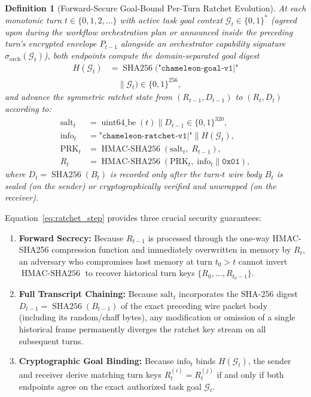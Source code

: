 \documentclass[conference,10pt]{IEEEtran}
\newtheorem{definition}{Definition}
\begin{document}
\begin{definition}[Forward-Secure Goal-Bound Per-Turn Ratchet Evolution]
\label{def:ratchet}
At each monotonic turn $t \in \{0, 1, 2, \dots\}$ with active task goal context $\mathcal{G}_t \in \{0,1\}^*$ (agreed upon during the workflow orchestration plan or announced inside the preceding turn's encrypted envelope $P_{t-1}$ alongside an orchestrator capability signature $\sigma_{\text{orch}}(\mathcal{G}_t)$), both endpoints compute the domain-separated goal digest
\begin{equation}
\label{eq:goal_digest}
\begin{aligned}
H(\mathcal{G}_t) &= \operatorname{SHA256}\big(\texttt{"chameleon-goal-v1|"} \\
&\quad \parallel \mathcal{G}_t\big) \in \{0,1\}^{256},
\end{aligned}
\end{equation}
and advance the symmetric ratchet state from $(R_{t-1}, D_{t-1})$ to $(R_t, D_t)$ according to:
\begin{equation}
\label{eq:ratchet_step}
\begin{aligned}
\text{salt}_t &= \operatorname{uint64\_be}(t) \parallel D_{t-1} \in \{0,1\}^{320}, \\
\text{info}_t &= \texttt{"chameleon-ratchet-v1|"} \parallel H(\mathcal{G}_t), \\
\text{PRK}_t &= \operatorname{HMAC-SHA256}\left(\text{salt}_t,\; R_{t-1}\right), \\
R_t &= \operatorname{HMAC-SHA256}\left(\text{PRK}_t,\; \text{info}_t \parallel \mathtt{0x01}\right),
\end{aligned}
\end{equation}
where $D_t = \operatorname{SHA256}(B_t)$ is recorded only after the turn-$t$ wire body $B_t$ is sealed (on the sender) or cryptographically verified and unwrapped (on the receiver).
\end{definition}

Equation~\eqref{eq:ratchet_step} provides three crucial security guarantees:
\begin{enumerate}
    \item \textbf{Forward Secrecy:} Because $R_{t-1}$ is processed through the one-way HMAC-SHA256 compression function and immediately overwritten in memory by $R_t$, an adversary who compromises host memory at turn $t_0 > t$ cannot invert $\operatorname{HMAC-SHA256}$ to recover historical turn keys $\{R_0, \dots, R_{t_0-1}\}$.
    \item \textbf{Full Transcript Chaining:} Because $\text{salt}_t$ incorporates the SHA-256 digest $D_{t-1} = \operatorname{SHA256}(B_{t-1})$ of the exact preceding wire packet body (including its random/chaff bytes), any modification or omission of a single historical frame permanently diverges the ratchet key stream on all subsequent turns.
    \item \textbf{Cryptographic Goal Binding:} Because $\text{info}_t$ binds $H(\mathcal{G}_t)$, the sender and receiver derive matching turn keys $R_t^{(i)} = R_t^{(j)}$ if and only if both endpoints agree on the exact authorized task goal $\mathcal{G}_t$.
\end{enumerate}
\end{document}
